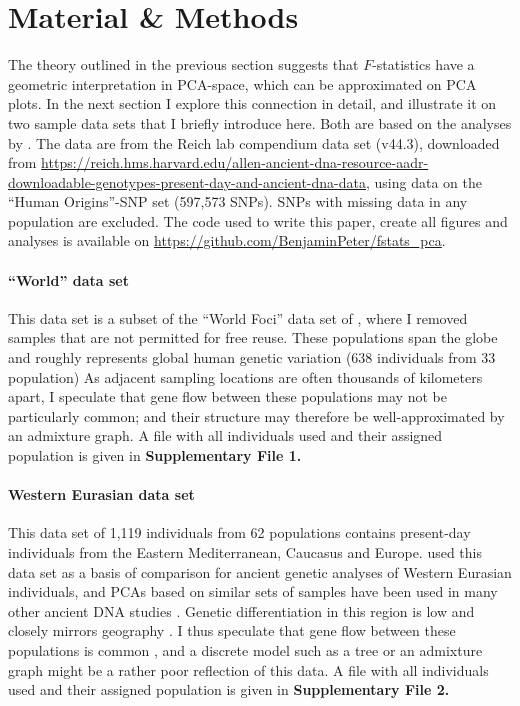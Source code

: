 \documentclass[12pt,fullpage, a4paper]{article}
\begin{document}
\section{Material \& Methods}
The theory outlined in the previous section suggests that $F$-statistics have a geometric interpretation in PCA-space, which can be approximated on PCA plots. In the next section I explore this connection in detail, and illustrate it on two sample data sets that I briefly introduce here. Both are based on the analyses by \cite{lazaridis2014}. The data are from the Reich lab compendium data set (v44.3), downloaded from \url{https://reich.hms.harvard.edu/allen-ancient-dna-resource-aadr-downloadable-genotypes-present-day-and-ancient-dna-data}, using data on the ``Human Origins''-SNP set (597,573 SNPs). SNPs with missing data in any population are excluded. The code used to write this paper, create all figures and analyses is  available on \url{https://github.com/BenjaminPeter/fstats_pca}.

\paragraph{``World'' data set}
This data set is a subset of the ``World Foci'' data set of \cite{lazaridis2014}, where I removed samples that are not permitted for free reuse. These populations span the globe and roughly represents global human genetic variation (638 individuals from 33 population) As adjacent sampling locations are often thousands of kilometers apart, I speculate that gene flow between these populations may not be particularly common; and their structure may therefore be well-approximated by an admixture graph. A file with all individuals used and their assigned population is given in \textbf{Supplementary File 1.}

\paragraph{Western Eurasian data set}
This data set of 1,119 individuals from 62 populations contains  present-day individuals from the Eastern Mediterranean, Caucasus and Europe.  \cite{lazaridis2014} used this data set as a basis of comparison for ancient genetic analyses of Western Eurasian individuals, and PCAs based on similar sets of samples have been used in many other ancient DNA studies \citep[e.g.][]{lazaridis2016, haak2015}. Genetic differentiation in this region is low and closely mirrors geography \citep{novembre2008}. I thus speculate that gene flow between these populations is common \citep{ralph2013}, and a discrete model such as a tree or an admixture graph might be a rather poor reflection of this data. A file with all individuals used and their assigned population is given in \textbf{Supplementary File 2.}
\end{document}
